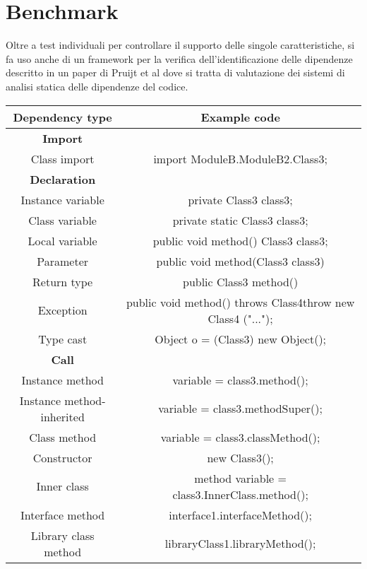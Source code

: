 \section{Benchmark}

Oltre a test individuali per controllare il supporto delle singole caratteristiche, si fa uso anche di un framework per la verifica dell'identificazione delle dipendenze descritto in un paper di Pruijt et al \cite{DBLP:journals/spe/PruijtKWB17} dove si tratta di valutazione dei sistemi di analisi statica delle dipendenze del codice.

\begin{center}
    \begin{tabular}{|c c|}
        \hline
        Dependency type & Example code \\
        \hline
        \textbf{Import} &  \\
        Class import & import ModuleB.ModuleB2.Class3; \\
        \textbf{Declaration} &  \\
        Instance variable & private Class3 class3; \\
        Class variable & private static Class3 class3; \\
        Local variable & public void method() {Class3 class3; } \\
        Parameter & public void method(Class3 class3) {} \\
        Return type & public Class3 method() {} \\
        Exception & public void method() throws Class4{throw new Class4 ("..."); } \\
        Type cast & Object o = (Class3) new Object(); \\
        \textbf{Call} &  \\
        Instance method & variable = class3.method(); \\
        Instance method-inherited & variable = class3.methodSuper(); \\
        Class method & variable = class3.classMethod(); \\
        Constructor & new Class3(); \\
        Inner class & method variable = class3.InnerClass.method(); \\
        Interface method & interface1.interfaceMethod(); \\
        Library class method & libraryClass1.libraryMethod(); \\

\end{tabular}
\end{center}
